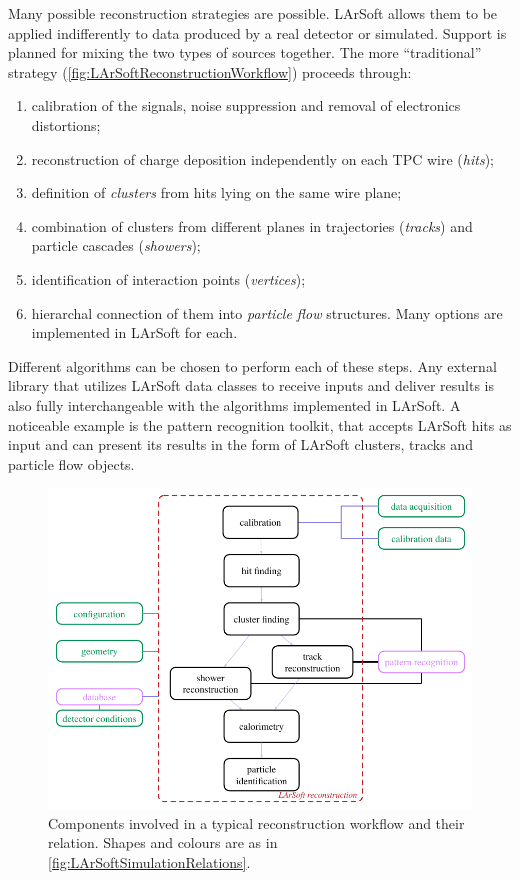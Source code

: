 Many possible reconstruction strategies are possible.
LArSoft allows them to be applied indifferently to data produced by a real detector or simulated.
Support is planned for mixing the two types of sources together.
The more ``traditional'' strategy (\cref{fig:LArSoftReconstructionWorkflow}) proceeds through:
\begin{enumerate}
  \item calibration of the signals, noise suppression and removal of electronics distortions;
  \item reconstruction of charge deposition independently on each TPC wire (\emph{hits});
  \item definition of \emph{clusters} from hits lying on the same wire plane;
  \item combination of clusters from different planes in trajectories (\emph{tracks}) and particle cascades (\emph{showers});
  \item identification of interaction points (\emph{vertices});
  \item hierarchal connection of them into \emph{particle flow} structures. Many options are implemented in LArSoft for each.
\end{enumerate}
Different algorithms can be chosen to perform each of these steps.
Any external library that utilizes LArSoft data classes to receive inputs
and deliver results is also fully interchangeable with the algorithms implemented in LArSoft.
A noticeable example is the \Pandora pattern recognition toolkit,
that accepts LArSoft hits as input and can present its results in the form of LArSoft clusters,
tracks and particle flow objects.

\begin{figure}
   \centering
   \includegraphics{figures/LArSoftReconstructionRelations}
   \caption[Relation between components for a typical reconstruction workflow]{
      \label{fig:LArSoftReconstructionComponents}
      Components involved in a typical reconstruction workflow and their relation.
      Shapes and colours are as in \cref{fig:LArSoftSimulationRelations}.
   }
\end{figure}

